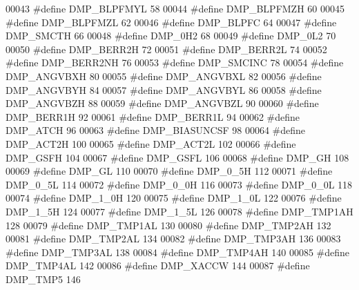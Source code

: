 \begin{DoxyCode}
00043 \textcolor{preprocessor}{#define DMP\_BLPFMYL    58}
00044 \textcolor{preprocessor}{#define DMP\_BLPFMZH    60}
00045 \textcolor{preprocessor}{#define DMP\_BLPFMZL    62}
00046 \textcolor{preprocessor}{#define DMP\_BLPFC    64}
00047 \textcolor{preprocessor}{#define DMP\_SMCTH    66}
00048 \textcolor{preprocessor}{#define DMP\_0H2    68}
00049 \textcolor{preprocessor}{#define DMP\_0L2    70}
00050 \textcolor{preprocessor}{#define DMP\_BERR2H    72}
00051 \textcolor{preprocessor}{#define DMP\_BERR2L    74}
00052 \textcolor{preprocessor}{#define DMP\_BERR2NH    76}
00053 \textcolor{preprocessor}{#define DMP\_SMCINC    78}
00054 \textcolor{preprocessor}{#define DMP\_ANGVBXH    80}
00055 \textcolor{preprocessor}{#define DMP\_ANGVBXL    82}
00056 \textcolor{preprocessor}{#define DMP\_ANGVBYH    84}
00057 \textcolor{preprocessor}{#define DMP\_ANGVBYL    86}
00058 \textcolor{preprocessor}{#define DMP\_ANGVBZH    88}
00059 \textcolor{preprocessor}{#define DMP\_ANGVBZL    90}
00060 \textcolor{preprocessor}{#define DMP\_BERR1H    92}
00061 \textcolor{preprocessor}{#define DMP\_BERR1L    94}
00062 \textcolor{preprocessor}{#define DMP\_ATCH    96}
00063 \textcolor{preprocessor}{#define DMP\_BIASUNCSF    98}
00064 \textcolor{preprocessor}{#define DMP\_ACT2H    100}
00065 \textcolor{preprocessor}{#define DMP\_ACT2L    102}
00066 \textcolor{preprocessor}{#define DMP\_GSFH    104}
00067 \textcolor{preprocessor}{#define DMP\_GSFL    106}
00068 \textcolor{preprocessor}{#define DMP\_GH    108}
00069 \textcolor{preprocessor}{#define DMP\_GL    110}
00070 \textcolor{preprocessor}{#define DMP\_0\_5H    112}
00071 \textcolor{preprocessor}{#define DMP\_0\_5L    114}
00072 \textcolor{preprocessor}{#define DMP\_0\_0H    116}
00073 \textcolor{preprocessor}{#define DMP\_0\_0L    118}
00074 \textcolor{preprocessor}{#define DMP\_1\_0H    120}
00075 \textcolor{preprocessor}{#define DMP\_1\_0L    122}
00076 \textcolor{preprocessor}{#define DMP\_1\_5H    124}
00077 \textcolor{preprocessor}{#define DMP\_1\_5L    126}
00078 \textcolor{preprocessor}{#define DMP\_TMP1AH    128}
00079 \textcolor{preprocessor}{#define DMP\_TMP1AL    130}
00080 \textcolor{preprocessor}{#define DMP\_TMP2AH    132}
00081 \textcolor{preprocessor}{#define DMP\_TMP2AL    134}
00082 \textcolor{preprocessor}{#define DMP\_TMP3AH    136}
00083 \textcolor{preprocessor}{#define DMP\_TMP3AL    138}
00084 \textcolor{preprocessor}{#define DMP\_TMP4AH    140}
00085 \textcolor{preprocessor}{#define DMP\_TMP4AL    142}
00086 \textcolor{preprocessor}{#define DMP\_XACCW    144}
00087 \textcolor{preprocessor}{#define DMP\_TMP5    146}

\end{DoxyCode}

